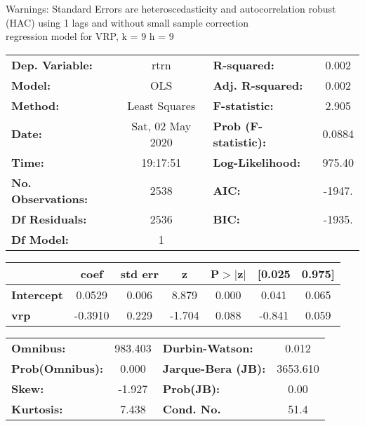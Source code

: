 Warnings: \newline
 [1] Standard Errors are heteroscedasticity and autocorrelation robust (HAC) using 1 lags and without small sample correction\\ 

regression model for VRP, k = 9 h = 9\begin{center}
\begin{tabular}{lclc}
\toprule
\textbf{Dep. Variable:}    &       rtrn       & \textbf{  R-squared:         } &     0.002   \\
\textbf{Model:}            &       OLS        & \textbf{  Adj. R-squared:    } &     0.002   \\
\textbf{Method:}           &  Least Squares   & \textbf{  F-statistic:       } &     2.905   \\
\textbf{Date:}             & Sat, 02 May 2020 & \textbf{  Prob (F-statistic):} &   0.0884    \\
\textbf{Time:}             &     19:17:51     & \textbf{  Log-Likelihood:    } &    975.40   \\
\textbf{No. Observations:} &        2538      & \textbf{  AIC:               } &    -1947.   \\
\textbf{Df Residuals:}     &        2536      & \textbf{  BIC:               } &    -1935.   \\
\textbf{Df Model:}         &           1      & \textbf{                     } &             \\
\bottomrule
\end{tabular}
\begin{tabular}{lcccccc}
                   & \textbf{coef} & \textbf{std err} & \textbf{z} & \textbf{P$> |$z$|$} & \textbf{[0.025} & \textbf{0.975]}  \\
\midrule
\textbf{Intercept} &       0.0529  &        0.006     &     8.879  &         0.000        &        0.041    &        0.065     \\
\textbf{vrp}       &      -0.3910  &        0.229     &    -1.704  &         0.088        &       -0.841    &        0.059     \\
\bottomrule
\end{tabular}
\begin{tabular}{lclc}
\textbf{Omnibus:}       & 983.403 & \textbf{  Durbin-Watson:     } &    0.012  \\
\textbf{Prob(Omnibus):} &   0.000 & \textbf{  Jarque-Bera (JB):  } & 3653.610  \\
\textbf{Skew:}          &  -1.927 & \textbf{  Prob(JB):          } &     0.00  \\
\textbf{Kurtosis:}      &   7.438 & \textbf{  Cond. No.          } &     51.4  \\
\bottomrule
\end{tabular}
\end{center}


